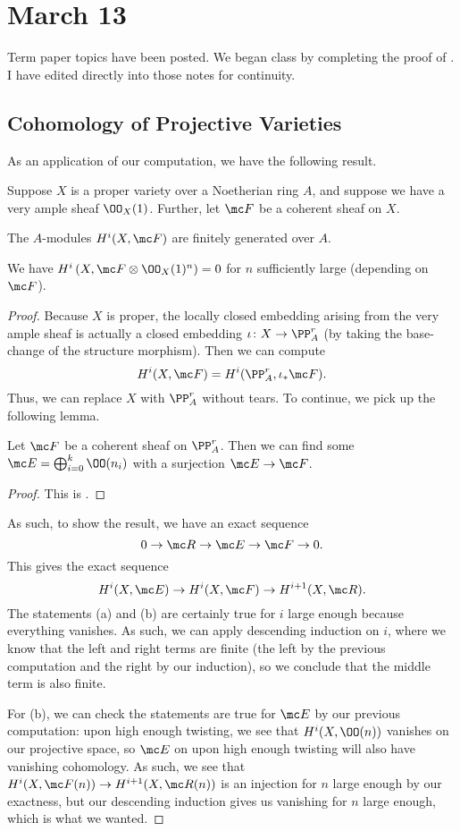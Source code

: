 \documentclass[../notes.tex]{subfiles}
\begin{document}
\section{March 13}

Term paper topics have been posted. We began class by completing the proof of . I have edited directly into those notes for continuity.

\subsection{Cohomology of Projective Varieties}
As an application of our computation, we have the following result.
\begin{theorem}[Serre] \label{thm:very-ample-kills-cohom}
	Suppose $X$ is a proper variety over a Noetherian ring $A$, and suppose we have a very ample sheaf $\OO_X(1)$. Further, let $\mc F$ be a coherent sheaf on $X$.
	\begin{listalph}
		\item The $A$-modules $H^i(X,\mc F)$ are finitely generated over $A$.
		\item We have $H^i\left(X,\mc F\otimes\OO_X(1)^n\right)=0$ for $n$ sufficiently large (depending on $\mc F$).
	\end{listalph}
\end{theorem}
\begin{proof}
	Because $X$ is proper, the locally closed embedding arising from the very ample sheaf is actually a closed embedding $\iota\colon X\to\PP^r_A$ (by taking the base-change of the structure morphism). Then we can compute
	\[H^i(X,\mc F)=H^i(\PP^r_A,\iota_*\mc F).\]
	Thus, we can replace $X$ with $\PP^r_A$ without tears. To continue, we pick up the following lemma.
	\begin{lemma}
		Let $\mc F$ be a coherent sheaf on $\PP^r_A$. Then we can find some $\mc E=\bigoplus_{i=0}^k\OO(n_i)$ with a surjection $\mc E\to\mc F$.
	\end{lemma}
	\begin{proof}
		This is \cite[Corollary~II.5.18]{hartshorne}.
	\end{proof}
	As such, to show the result, we have an exact sequence
	\[0\to\mc R\to\mc E\to\mc F\to0.\]
	This gives the exact sequence
	\[H^i(X,\mc E)\to H^i(X,\mc F)\to H^{i+1}(X,\mc R).\]
	The statements (a) and (b) are certainly true for $i$ large enough because everything vanishes. As such, we can apply descending induction on $i$, where we know that the left and right terms are finite (the left by the previous computation and the right by our induction), so we conclude that the middle term is also finite.

	For (b), we can check the statements are true for $\mc E$ by our previous computation: upon high enough twisting, we see that $H^i(X,\OO(n))$ vanishes on our projective space, so $\mc E$ on upon high enough twisting will also have vanishing cohomology. As such, we see that $H^i(X,\mc F(n))\to H^{i+1}(X,\mc R(n))$ is an injection for $n$ large enough by our exactness, but our descending induction gives us vanishing for $n$ large enough, which is what we wanted.
\end{proof}
\end{document}

